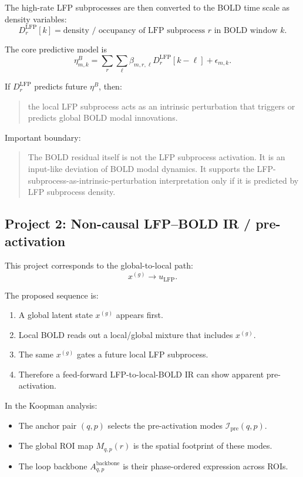 \documentclass[11pt,a4paper]{article}
\begin{document}
The high-rate LFP subprocesses are then converted to the BOLD time scale as density variables:
\begin{equation}
D_r^{\mathrm{LFP}}[k]
=
\text{density / occupancy of LFP subprocess } r
\text{ in BOLD window } k.
\end{equation}

The core predictive model is
\begin{equation}
\eta_{m,k}^B
=
\sum_r\sum_{\ell}
\beta_{m,r,\ell}D_r^{\mathrm{LFP}}[k-\ell]
+
\epsilon_{m,k}.
\end{equation}

If $D_r^{\mathrm{LFP}}$ predicts future $\eta^B$, then:
\begin{quote}
the local LFP subprocess acts as an intrinsic perturbation that triggers or predicts global BOLD modal innovations.
\end{quote}

Important boundary:
\begin{quote}
The BOLD residual itself is not the LFP subprocess activation. It is an input-like deviation of BOLD modal dynamics. It supports the LFP-subprocess-as-intrinsic-perturbation interpretation only if it is predicted by LFP subprocess density.
\end{quote}

\subsection{Project 2: Non-causal LFP--BOLD IR / pre-activation}

This project corresponds to the global-to-local path:
\begin{equation}
    x^{(g)} \rightarrow u_{\mathrm{LFP}}.
\end{equation}

The proposed sequence is:
\begin{enumerate}
    \item A global latent state $x^{(g)}$ appears first.
    \item Local BOLD reads out a local/global mixture that includes $x^{(g)}$.
    \item The same $x^{(g)}$ gates a future local LFP subprocess.
    \item Therefore a feed-forward LFP-to-local-BOLD IR can show apparent pre-activation.
\end{enumerate}

In the Koopman analysis:
\begin{itemize}
    \item The anchor pair $(q,p)$ selects the pre-activation modes $\mathcal I_{\mathrm{pre}}(q,p)$.
    \item The global ROI map $M_{q,p}(r)$ is the spatial footprint of these modes.
    \item The loop backbone $A_{q,p}^{\mathrm{backbone}}$ is their phase-ordered expression across ROIs.
\end{itemize}
\end{document}
